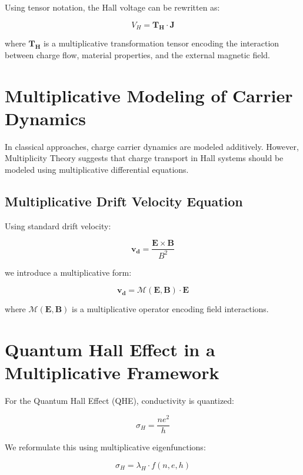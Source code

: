 \documentclass{article}
\theoremstyle{plain}
\begin{document}
Using tensor notation, the Hall voltage can be rewritten as:

\begin{equation}
V_H = \mathbf{T_H} \cdot \mathbf{J}
\end{equation}

where $\mathbf{T_H}$ is a multiplicative transformation tensor encoding the interaction between charge flow, material properties, and the external magnetic field.

\section{Multiplicative Modeling of Carrier Dynamics}

In classical approaches, charge carrier dynamics are modeled additively. However, Multiplicity Theory suggests that charge transport in Hall systems should be modeled using multiplicative differential equations.

\subsection{Multiplicative Drift Velocity Equation}
Using standard drift velocity:

\begin{equation}
\mathbf{v_d} = \frac{\mathbf{E} \times \mathbf{B}}{B^2}
\end{equation}

we introduce a multiplicative form:

\begin{equation}
\mathbf{v_d} = \mathcal{M}(\mathbf{E}, \mathbf{B}) \cdot \mathbf{E}
\end{equation}

where $\mathcal{M}(\mathbf{E}, \mathbf{B})$ is a multiplicative operator encoding field interactions.

\section{Quantum Hall Effect in a Multiplicative Framework}

For the Quantum Hall Effect (QHE), conductivity is quantized:

\begin{equation}
\sigma_H = \frac{n e^2}{h}
\end{equation}

We reformulate this using multiplicative eigenfunctions:

\begin{equation}
\sigma_H = \lambda_H \cdot f(n, e, h)
\end{equation}
\end{document}
